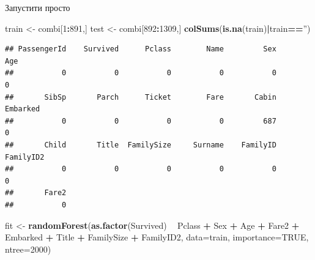 \documentclass[ignorenonframetext,]{beamer}
\newenvironment{Shaded}{\begin{snugshade}}{\end{snugshade}}
\newcommand{\DataTypeTok}[1]{\textcolor[rgb]{0.13,0.29,0.53}{#1}}
\newcommand{\DecValTok}[1]{\textcolor[rgb]{0.00,0.00,0.81}{#1}}
\newcommand{\KeywordTok}[1]{\textcolor[rgb]{0.13,0.29,0.53}{\textbf{#1}}}
\newcommand{\NormalTok}[1]{#1}
\newcommand{\OperatorTok}[1]{\textcolor[rgb]{0.81,0.36,0.00}{\textbf{#1}}}
\newcommand{\OtherTok}[1]{\textcolor[rgb]{0.56,0.35,0.01}{#1}}
\newcommand{\StringTok}[1]{\textcolor[rgb]{0.31,0.60,0.02}{#1}}
\begin{document}
\begin{frame}[fragile]{Запустити просто}
\protect\hypertarget{ux437ux430ux43fux443ux441ux442ux438ux442ux438-ux43fux440ux43eux441ux442ux43e}{}

\begin{Shaded}
\begin{Highlighting}[]
\NormalTok{train <-}\StringTok{ }\NormalTok{combi[}\DecValTok{1}\OperatorTok{:}\DecValTok{891}\NormalTok{,]}
\NormalTok{test <-}\StringTok{ }\NormalTok{combi[}\DecValTok{892}\OperatorTok{:}\DecValTok{1309}\NormalTok{,]}
\KeywordTok{colSums}\NormalTok{(}\KeywordTok{is.na}\NormalTok{(train)}\OperatorTok{|}\NormalTok{train}\OperatorTok{==}\StringTok{''}\NormalTok{)}
\end{Highlighting}
\end{Shaded}

\begin{verbatim}
## PassengerId    Survived      Pclass        Name         Sex         Age 
##           0           0           0           0           0           0 
##       SibSp       Parch      Ticket        Fare       Cabin    Embarked 
##           0           0           0           0         687           0 
##       Child       Title  FamilySize     Surname    FamilyID   FamilyID2 
##           0           0           0           0           0           0 
##       Fare2 
##           0
\end{verbatim}

\begin{Shaded}
\begin{Highlighting}[]
\NormalTok{fit <-}\StringTok{ }\KeywordTok{randomForest}\NormalTok{(}\KeywordTok{as.factor}\NormalTok{(Survived) }\OperatorTok{~}\StringTok{ }\NormalTok{Pclass }\OperatorTok{+}\StringTok{ }\NormalTok{Sex }\OperatorTok{+}\StringTok{ }\NormalTok{Age  }\OperatorTok{+}\StringTok{ }\NormalTok{Fare2 }\OperatorTok{+}
\StringTok{                                            }\NormalTok{Embarked }\OperatorTok{+}\StringTok{ }\NormalTok{Title }\OperatorTok{+}\StringTok{ }\NormalTok{FamilySize }\OperatorTok{+}\StringTok{ }\NormalTok{FamilyID2,}
                      \DataTypeTok{data=}\NormalTok{train, }
                      \DataTypeTok{importance=}\OtherTok{TRUE}\NormalTok{, }
                      \DataTypeTok{ntree=}\DecValTok{2000}\NormalTok{)}
\end{Highlighting}
\end{Shaded}

\end{frame}
\end{document}
